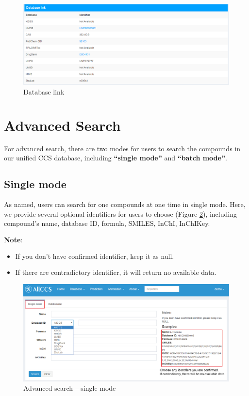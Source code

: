 \documentclass[12pt,]{book}
\providecommand{\tightlist}{%
  \setlength{\itemsep}{0pt}\setlength{\parskip}{0pt}}
\begin{document}
\begin{figure}

{\centering \includegraphics{images/chapter2/figure2.7database_link} 

}

\caption{Database link}\label{fig:figure2d7}
\end{figure}

\section{Advanced Search}\label{chapter2d3}

For advanced search, there are two modes for users to search the
compounds in our unified CCS database, including \textbf{``single
mode''} and \textbf{``batch mode''}.

\subsection{Single mode}\label{chapter2d3d1}

As named, users can search for one compounds at one time in single mode.
Here, we provide several optional identifiers for users to choose
(Figure \ref{fig:figure2d8}), including compound's name, database ID,
formula, SMILES, InChI, InChIKey.

\textbf{Note}:

\begin{itemize}
\tightlist
\item
  If you don't have confirmed identifier, keep it as null.
\item
  If there are contradictory identifier, it will return no available
  data.
\end{itemize}

\begin{figure}

{\centering \includegraphics{images/chapter2/figure2.8advance_search_single} 

}

\caption{Advanced search – single mode}\label{fig:figure2d8}
\end{figure}
\end{document}
